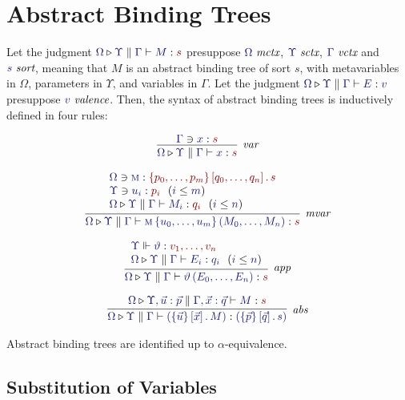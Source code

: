 \documentclass[11pt]{article}
\theoremstyle{definition}
\theoremstyle{remark}
\numberwithin{equation}{section}
\def\IModeColorName{MidnightBlue}
\def\OModeColorName{Maroon}
\newcommand\IMode[1]{{\color{\IModeColorName}{#1}}}
\newcommand\OMode[1]{{\color{\OModeColorName}{#1}}}
\newcommand\HypJ[2]{#1\ \ (#2)}
\newcommand\MkValence[3]{\left\{#1\right\}\left[#2\right].\, #3}
\newcommand\MkBTm[3]{\left\{#1\right\}\left[#2\right].\, #3}
\newcommand\IsValence[1]{\IMode{#1}\ \textit{valence}}
\newcommand\IsSort[1]{\IMode{#1}\ \textit{sort}}
\newcommand\Leq[2]{\IMode{#1}\leq\IMode{#2}}
\newcommand\IsOperator[3]{\IMode{#1}\Vdash \IMode{#2} : \OMode{#3}}
\newcommand\IsMetaCtx[1]{\IMode{#1}\ \textit{mctx}}
\newcommand\IsVarCtx[1]{\IMode{#1}\ \textit{vctx}}
\newcommand\IsSymCtx[1]{\IMode{#1}\ \textit{sctx}}
\newcommand\Lookup[3]{\IMode{#1}\ni\IMode{#2}:\OMode{#3}}
\newcommand\IsAbt[5]{%
  \IMode{#1}\triangleright%
  \IMode{#2}\parallel%
  \IMode{#3}\vdash%
  \IMode{#4}:\OMode{#5}%
}
\newcommand\IsBTm[5]{%
  \IMode{#1}\triangleright%
  \IMode{#2}\parallel%
  \IMode{#3}\vdash%
  \IMode{#4}:\IMode{#5}%
}
\newcommand\MV[1]{\textsc{#1}}
\newcommand\MApp[3]{#1\left\{#2\right\}\left(#3\right)}
\newcommand\App[2]{#1\left(#2\right)}
\begin{document}
\section{Abstract Binding Trees}

Let the judgment $\IsAbt{\Omega}{\Upsilon}{\Gamma}{M}{s}$ presuppose
$\IsMetaCtx{\Omega}$, $\IsSymCtx\Upsilon$, $\IsVarCtx\Gamma$ and $\IsSort{s}$,
meaning that $M$ is an abstract binding tree of sort $s$, with metavariables in
$\Omega$, parameters in $\Upsilon$, and variables in $\Gamma$. Let the judgment
$\IsBTm{\Omega}{\Upsilon}{\Gamma}{E}{v}$ presuppose $\IsValence{v}$.  Then, the
syntax of abstract binding trees is inductively defined in four rules:

\begin{gather*}
  \infer[\textit{var}]{
    \IsAbt{\Omega}{\Upsilon}{\Gamma}{x}{s}
  }{
    \Lookup{\Gamma}{x}{s}
  }\\[6pt]
  \infer[\textit{mvar}]{
    \IsAbt{\Omega}{\Upsilon}{\Gamma}{
      \MApp{\MV{m}}{u_0,\dots,u_m}{M_0,\dots,M_n}
    }{s}
  }{
    \begin{array}{l}
      \Lookup{\Omega}{\MV{m}}{\MkValence{p_0,\dots,p_m}{q_0,\dots,q_n}{s}}\\
      \HypJ{\Lookup{\Upsilon}{u_i}{p_i}}{\Leq{i}{m}}\\
      \HypJ{
        \IsAbt{\Omega}{\Upsilon}{\Gamma}{M_i}{q_i}
      }{
        \Leq{i}{n}
      }
    \end{array}
  }\\[6pt]
  \infer[\textit{app}]{
    \IsAbt{\Omega}{\Upsilon}{\Gamma}{
      \App{\vartheta}{E_0,\dots,E_n}
    }{s}
  }{
    \begin{array}{l}
      \IsOperator{\Upsilon}{\vartheta}{
        v_1,\dots,v_n
      }\\
      \HypJ{
        \IsBTm{\Omega}{\Upsilon}{\Gamma}{E_i}{q_i}
      }{
        \Leq{i}{n}
      }
    \end{array}
  }\\[6pt]
  \infer[\textit{abs}]{
    \IsBTm{\Omega}{\Upsilon}{\Gamma}{
      \left(\MkBTm{\vec{u}}{\vec{x}}{M}\right)
    }{
      \left(\MkValence{\vec{p}}{\vec{q}}{s}\right)
    }
  }{
    \IsAbt{\Omega}{\Upsilon, \vec{u}:\vec{p}}{\Gamma,\vec{x}:{\vec{q}}}{
      M
    }{
      s
    }
  }
\end{gather*}

Abstract binding trees are identified up to $\alpha$-equivalence.

\subsection{Substitution of Variables}
\end{document}
